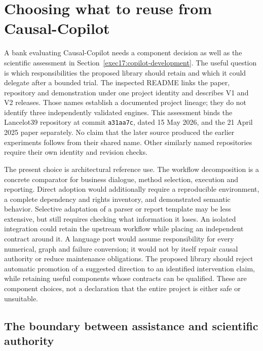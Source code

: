 \section{Choosing what to reuse from Causal-Copilot}
\label{sec:exec25-copilot-reuse}

A bank evaluating Causal-Copilot needs a component decision as well as the
scientific assessment in Section~\ref{exec17:copilot-development}. The useful
question is which responsibilities the proposed library should retain and
which it could delegate after a bounded trial. The inspected README links the
paper, repository and demonstration under one project identity and describes
V1 and V2 releases. Those names establish a documented project lineage; they
do not identify three independently validated engines. This assessment binds
the Lancelot39 repository at commit \texttt{a31aa7c}, dated 15 May 2026, and the
21 April 2025 paper separately. No claim that the later source produced the
earlier experiments follows from their shared name. Other similarly named
repositories require their own identity and revision checks.
\citep{exec17_copilot_paper,exec17_copilot_code}

The present choice is architectural reference use. The workflow decomposition
is a concrete comparator for business dialogue, method selection, execution
and reporting. Direct adoption would additionally require a reproducible
environment, a complete dependency and rights inventory, and demonstrated
semantic behavior. Selective adaptation of a parser or report template may be
less extensive, but still requires checking what information it loses. An
isolated integration could retain the upstream workflow while placing an
independent contract around it. A language port would assume responsibility
for every numerical, graph and failure conversion; it would not by itself
repair causal authority or reduce maintenance obligations. The proposed
library should reject automatic promotion of a suggested direction to an
identified intervention claim, while retaining useful components whose
contracts can be qualified. These are component choices, not a declaration
that the entire project is either safe or unsuitable.
\citep{exec17_copilot_code,exec25_copilot_choice}

\subsection{The boundary between assistance and scientific authority}

